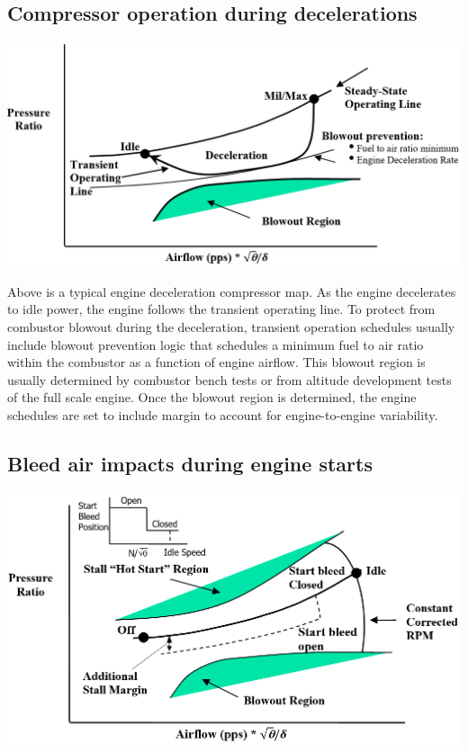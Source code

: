 \documentclass[
]{book}
\begin{document}
\hypertarget{compressor-operation-during-decelerations}{%
\subsection{Compressor operation during decelerations}\label{compressor-operation-during-decelerations}}

\includegraphics{media/17/eng-decel-compressor-map.png}

Above is a typical engine deceleration compressor map. As the engine decelerates
to idle power, the engine follows the transient operating line. To protect from
combustor blowout during the deceleration, transient operation schedules usually
include blowout prevention logic that schedules a minimum fuel to air ratio
within the combustor as a function of engine airflow. This blowout region is
usually determined by combustor bench tests or from altitude development tests
of the full scale engine. Once the blowout region is determined, the engine
schedules are set to include margin to account for engine-to-engine variability.

\hypertarget{bleed-air-impacts-during-engine-starts}{%
\subsection{Bleed air impacts during engine starts}\label{bleed-air-impacts-during-engine-starts}}

\includegraphics{media/17/eng-start-compressor-map.png}
\end{document}
